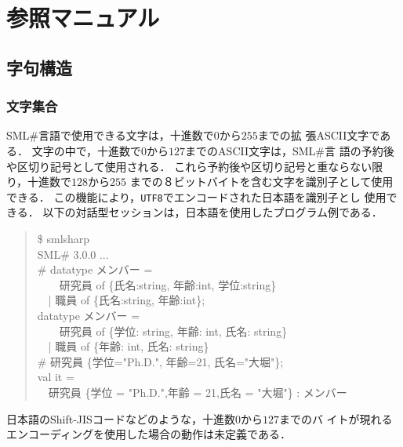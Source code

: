 \documentclass{jbook}
\newif\ifjp
\newcommand{\txt}[2]{#1}
\newcommand{\smlsharp}{SML\#}
\newcommand{\version}{3.0.0}
\newcommand{\code}[1]{\mbox{\large\tt #1}}
\newcommand{\myem}{\mbox{\ \ }}
\newenvironment{program}{\begin{quote}\begin{tt}}%
                        {\end{tt}\end{quote}}
\begin{document}
% 
% 
% 
	


\part{\txt{参照マニュアル}{Reference manual}}
\label{part:referenceManual}
        
\chapter{\txt{字句構造}{Lexical structure}}
\label{sec:lex}
\ifjp%
	\smlsharp{}言語の語彙の構造を定義する．
\else%
\fi%

\section{\txt{文字集合}{Character set}}
\ifjp%
	\smlsharp{}言語で使用できる文字は，十進数で$0$から$255$までの拡
張ASCII文字である．
	文字の中で，十進数で$0$から$127$までのASCII文字は，\smlsharp{}言
語の予約後や区切り記号として使用される．
	これら予約後や区切り記号と重ならない限り，十進数で$128$から$255$
までの８ビットバイトを含む文字を識別子として使用できる．
	この機能により，\code{UTF8}でエンコードされた日本語を識別子とし
使用できる．
	以下の対話型セッションは，日本語を使用したプログラム例である．
\begin{program}
  \$ smlsharp\\
  SML\# \version{} ...\\
  \# datatype メンバー = 
\\
   \myem\myem  研究員 of \{氏名:string, 年齢:int, 学位:string\} 
\\
   \myem | 職員 of \{氏名:string, 年齢:int\};
\\
  datatype メンバー =
\\
   \myem\myem 研究員 of \{学位: string, 年齢: int, 氏名: string\}
\\
  \myem | 職員 of \{年齢: int, 氏名: string\}
\\
  \# 研究員 \{学位="Ph.D.", 年齢=21, 氏名="大堀"\};
\\
  val it =
\\
  \myem 研究員 \{学位 = "Ph.D.",年齢 = 21,氏名 = "大堀"\} : メンバー
\end{program}
	日本語のShift-JISコードなどのような，十進数$0$から$127$までのバ
イトが現れるエンコーディングを使用した場合の動作は未定義である．
	
\end{document}
